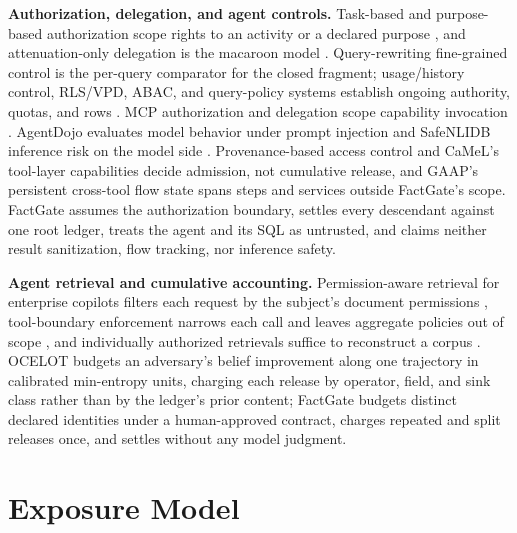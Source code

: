 \documentclass[10pt,journal,compsoc]{IEEEtran}
\newcommand{\system}{FactGate\xspace}
\begin{document}
\textbf{Authorization, delegation, and agent controls.} Task-based and
purpose-based authorization scope rights to an activity or a declared purpose
\cite{thomas1997tbac,byun2008purpose}, and attenuation-only delegation is the
macaroon model \cite{birgisson2014macaroons}. Query-rewriting fine-grained
control \cite{rizvi2004extending} is the per-query comparator for the closed
fragment; usage/history control, RLS/VPD, ABAC, and query-policy systems
establish ongoing authority, quotas, and rows
\cite{park2004ucon,abadi2003history,li2003delegation,postgres16rls,mehta2017qapla,zhang2022blockaid}. MCP authorization
and delegation scope capability invocation
\cite{mcp2025spec,south2025delegation}. AgentDojo evaluates
model behavior under prompt injection \cite{debenedetti2024agentdojo} and
SafeNLIDB inference risk on the model side \cite{liu2026safenlidb}.
Provenance-based access control \cite{park2012pbac} and CaMeL's tool-layer
capabilities \cite{debenedetti2025camel} decide admission, not cumulative
release, and GAAP's persistent cross-tool flow state \cite{stanley2026gaap}
spans steps and services outside \system's scope. \system assumes the authorization boundary, settles every descendant
against one root ledger, treats the agent and its SQL as untrusted, and
claims neither result sanitization, flow tracking, nor inference safety.


\textbf{Agent retrieval and cumulative accounting.} Permission-aware
retrieval for enterprise copilots filters each request by the subject's
document permissions \cite{bhatt2025participant}, tool-boundary
enforcement narrows each call and leaves aggregate policies out of scope
\cite{obpe2026}, and individually authorized retrievals suffice to
reconstruct a corpus \cite{wang2025ikea,he2025secret}. OCELOT
\cite{xie2026ocelot} budgets an adversary's belief improvement along one
trajectory in calibrated min-entropy units, charging each release by
operator, field, and sink class rather than by the ledger's prior content;
\system budgets distinct declared identities under a human-approved
contract, charges repeated and split releases once, and settles without
any model judgment.

\section{Exposure Model}
\label{sec:model}
\end{document}
